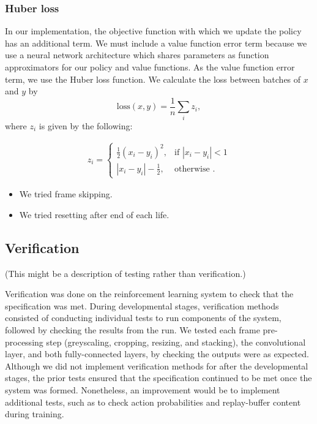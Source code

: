 \documentclass[12pt,a4paper]{article}
\begin{document}
\subsubsection{Huber loss}
In our implementation, the objective function with which we update the policy has an additional term. We must include a value function error term because we use a neural network architecture which shares parameters as function approximators for our policy and value functions. As the value function error term, we use the Huber loss function. We calculate the loss between batches of $x$ and $y$ by $$\text{loss}(x, y) = \frac{1}{n} \sum_{i} z_{i},$$ where $z_i$ is given by the following:

\[\begin{aligned}
z_{i} =
\begin{cases}
\frac{1}{2} (x_i - y_i)^2, & \text{if } |x_i - y_i| < 1 \\
|x_i - y_i| - \frac{1}{2}, & \text{otherwise }.
\end{cases}
\end{aligned}\]

\begin{itemize}
    
    \item We tried frame skipping.
    \item We tried resetting after end of each life. 
    
\end{itemize}



\subsection{Verification}
(This might be a description of testing rather than verification.)

Verification was done on the reinforcement learning system to check that the specification was met. During developmental stages, verification methods consisted of conducting individual tests to run components of the system, followed by checking the results from the run. We tested each frame pre-processing step (greyscaling, cropping, resizing, and stacking), the convolutional layer, and both fully-connected layers, by checking the outputs were as expected. Although we did not implement verification methods for after the developmental stages, the prior tests ensured that the specification continued to be met once the system was formed. Nonetheless, an improvement would be to implement additional tests, such as to check action probabilities and replay-buffer content during training.
\end{document}
